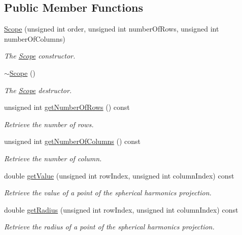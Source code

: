 \subsection*{Public Member Functions}
\begin{DoxyCompactItemize}
\item 
\hyperlink{class_hoa3_d_1_1_scope_ab4f5ff6674c4df165a1455e4648e1c35}{Scope} (unsigned int order, unsigned int number\-Of\-Rows, unsigned int number\-Of\-Columns)
\begin{DoxyCompactList}\small\item\em The \hyperlink{class_hoa3_d_1_1_scope}{Scope} constructor. \end{DoxyCompactList}\item 
\hyperlink{class_hoa3_d_1_1_scope_a84990cf90c7b3be0963f4cacbdab1df8}{$\sim$\-Scope} ()
\begin{DoxyCompactList}\small\item\em The \hyperlink{class_hoa3_d_1_1_scope}{Scope} destructor. \end{DoxyCompactList}\item 
unsigned int \hyperlink{class_hoa3_d_1_1_scope_aab635359344e855d855972752e6766c9}{get\-Number\-Of\-Rows} () const 
\begin{DoxyCompactList}\small\item\em Retrieve the number of rows. \end{DoxyCompactList}\item 
unsigned int \hyperlink{class_hoa3_d_1_1_scope_abdee40de6953ec537bbc72154ac93e6e}{get\-Number\-Of\-Columns} () const 
\begin{DoxyCompactList}\small\item\em Retrieve the number of column. \end{DoxyCompactList}\item 
double \hyperlink{class_hoa3_d_1_1_scope_a5dd62de174f903097d992da4f108037e}{get\-Value} (unsigned int row\-Index, unsigned int column\-Index) const 
\begin{DoxyCompactList}\small\item\em Retrieve the value of a point of the spherical harmonics projection. \end{DoxyCompactList}\item 
double \hyperlink{class_hoa3_d_1_1_scope_a2452963dd7f2ee7d61af6186d049db24}{get\-Radius} (unsigned int row\-Index, unsigned int column\-Index) const 
\begin{DoxyCompactList}\small\item\em Retrieve the radius of a point of the spherical harmonics projection. \end{DoxyCompactList}\item 

\end{DoxyCompactItemize}
